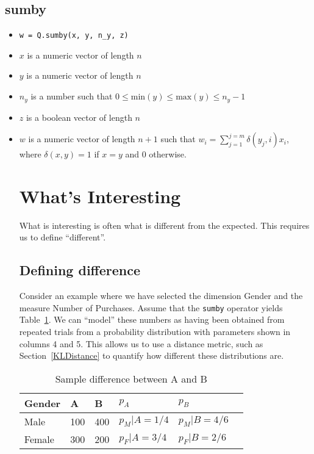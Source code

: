 \subsection{sumby}
\label{sumby}
\begin{itemize}
\item \verb+w = Q.sumby(x, y, n_y, z)+ 
\item \(x\) is a numeric vector of length \(n\)
\item \(y\) is a numeric vector of length \(n\)
\item \(n_y\) is a number such that 
\(0 \leq \mathrm{min}(y) \leq \mathrm{max}(y) \leq n_y-1\)
\item \(z\) is a boolean vector of length \(n\)
\item \(w\) is a numeric vector of length \(n+1\) such that 
\(w_i = \sum_{j=1}^{j=m} \delta(y_j, i) x_i\), where \(\delta(x, y) = 1 \) if
\(x = y\) and 0 otherwise.
\ei

\section{What's Interesting}
\label{interesting}

What is interesting is often what is different from the expected. This requires
us to define ``different''.


\subsection{Defining difference}

Consider an example where we have selected the dimension Gender and the measure Number of Purchases. Assume that 
the {\tt sumby} operator yields Table~\ref{tbl_sample_diff}. We can
``model'' these numbers as having been obtained from repeated trials from a
probability distribution with parameters shown in columns 4 and 5. This allows
us to use a distance metric, such as Section~\ref{KLDistance} to quantify how
different these distributions are.

\begin{table}
\centering
\begin{tabular}{|l|l|l|l|l|l|} \hline \hline
{\bf Gender}   & {\bf A } & {\bf B } & \(p_A\) & \(p_B\)  \\ \hline
Male   & 100 & 400  & \(p_M|A = 1/4\) & \(p_M|B = 4/6\)  \\ \hline
Female & 300 & 200  & \(p_F|A = 3/4\) & \(p_F|B = 2/6\)  \\ \hline
\hline
\end{tabular}
\caption{Sample difference between A and B}
\label{tbl_sample_diff}
\end{table}


\end{itemize}
